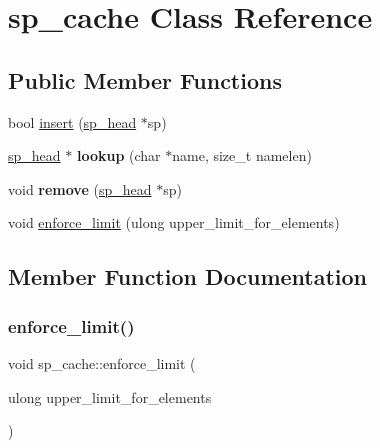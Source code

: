 \hypertarget{classsp__cache}{}\section{sp\+\_\+cache Class Reference}
\label{classsp__cache}
\subsection*{Public Member Functions}
\begin{DoxyCompactItemize}
\item 
bool \mbox{\hyperlink{classsp__cache_a1271ecde8fa8f445cc6d243b2e8bef5c}{insert}} (\mbox{\hyperlink{classsp__head}{sp\+\_\+head}} $\ast$sp)
\item 
\mbox{\label{classsp__cache_a2df7f2a12bff634edaf679adc43d349d}} 
\mbox{\hyperlink{classsp__head}{sp\+\_\+head}} $\ast$ {\bfseries lookup} (char $\ast$name, size\+\_\+t namelen)
\item 
\mbox{\label{classsp__cache_ad41e6d23ab4e71c46849810392e687fa}} 
void {\bfseries remove} (\mbox{\hyperlink{classsp__head}{sp\+\_\+head}} $\ast$sp)
\item 
void \mbox{\hyperlink{classsp__cache_aa3507d52d0cdf324f311a7130eea1057}{enforce\+\_\+limit}} (ulong upper\+\_\+limit\+\_\+for\+\_\+elements)
\end{DoxyCompactItemize}


\subsection{Member Function Documentation}
\mbox{\label{classsp__cache_aa3507d52d0cdf324f311a7130eea1057}} 
\subsubsection{\texorpdfstring{enforce\+\_\+limit()}{enforce\_limit()}}
{\footnotesize\ttfamily void sp\+\_\+cache\+::enforce\+\_\+limit (\begin{DoxyParamCaption}\item[{ulong}]{upper\+\_\+limit\+\_\+for\+\_\+elements }\end{DoxyParamCaption})\hspace{0.3cm}{\ttfamily [inline]}}

